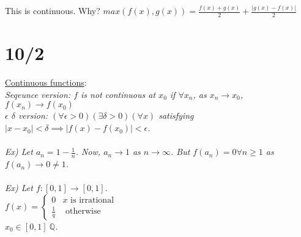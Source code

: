 \documentclass[11pt]{article}
\begin{document}
		This is continuous. Why?
		$max(f(x), g(x)) = \frac{f(x) + g(x)}{2} + \frac{|g(x) - f(x)|}{2}$\\

\section*{10/2}
	\underline{Continuous functions}:\\
		\em{Seqeunce version}: $f$ is not continuous at $x_0$ if $\forall x_n$,
		as $x_n \to x_0$, $f(x_n) \to f(x_0)$\\
		\em{$\epsilon$ $\delta$ version}: $(\forall \epsilon > 0)(\exists \delta
		> 0)(\forall x)$ satisfying $|x - x_0| < \delta \implies |f(x) - f(x_0)|
		< \epsilon$.\\\\
	Ex) Let $a_n = 1 - \frac{1}{n}$. Now, $a_n \to 1$ as $n \to \infty$. But 
	$f(a_n) = 0 \forall n \ge 1$ as $f(a_n) \to 0 \not= 1$.\\\\
	Ex) Let $f: [0, 1] \to [0, 1]$.\\
			$f(x) = \begin{cases} 0 & x \text{ is irrational} \\ \frac{1}{q} & \text{ otherwise}\end{cases}$\\
			$x_0 \in [0, 1] \ \mathbb{Q}$. 
\end{document}
